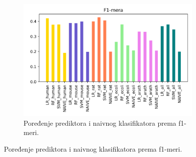 \begin{figure}[H]
	\begin{subfigure}{0.9\textwidth}
		\centering
		\includegraphics[width=\textwidth]{Figures/f1_poredjenje.png}
		\caption{Poređenje prediktora i naivnog klasifikatora prema f1-meri.}
		\label{fig:f1scores}
	\end{subfigure}


\end{figure}
